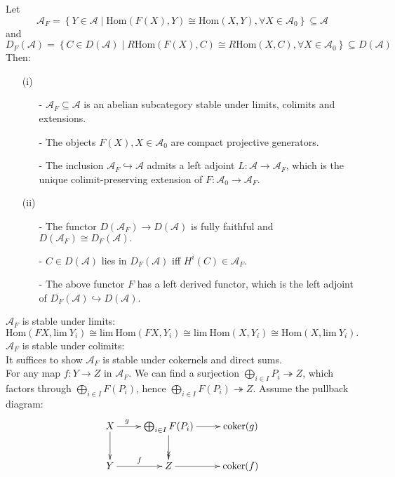 \documentclass[UTF8,12,a4paper]{ctexart}
\theoremstyle{definition}
\begin{document}
Let 
$$\mathcal{A}_F=\left\{Y\in\mathcal{A}\mid  
\text{Hom}(F(X),Y)\cong \text{Hom}(X,Y), \forall X\in\mathcal{A}_0
\right\}\subseteq \mathcal{A}$$
and 
$$
D_F(\mathcal{A})=\left\{C\in D(\mathcal{A})\mid  
R\text{Hom}(F(X),C)\cong R\text{Hom}(X,C), \forall X\in\mathcal{A}_0
\right\}\subseteq D(\mathcal{A})
$$
Then:
\begin{itemize}
\item [(i)]
	\begin{itemize}
		\item [-]	$\mathcal{A}_F \subseteq \mathcal{A}$ is an abelian subcategory stable under limits, colimits and extensions.
		\item [-]The objects $F(X), X\in \mathcal{A}_0$ are compact projective generators.
		\item [-]	The inclusion $\mathcal{A}_F\hookrightarrow \mathcal{A}$ admits a left adjoint $L:\mathcal{A}\rightarrow \mathcal{A}_F$, which is the unique colimit-preserving extension of $F:\mathcal{A}_0\rightarrow\mathcal{A}_F.$
	\end{itemize}
\item [(ii)] 
	\begin{itemize}
		\item [-]	The functor $D(\mathcal{A}_F)\rightarrow D(\mathcal{A})$ is fully faithful and $D(\mathcal{A}_F)\cong D_F(\mathcal{A}).$
		\item [-]$C\in D(\mathcal{A})$ lies in $D_F(\mathcal{A})$ iff $H^i(C)\in \mathcal{A}_F.$
		\item [-]	The above functor $F$ has a left derived functor, which is the left adjoint of $D_F(\mathcal{A})\hookrightarrow D(\mathcal{A}).$
	\end{itemize}
\end{itemize}
\pf 
$\mathcal{A}_F$ is stable under limits: \\
$
\text{Hom}(FX,\text{lim}\ Y_i)\cong \text{lim}\ \text{Hom}(FX, Y_i)\cong \text{lim}\ \text{Hom}(X, Y_i)\cong \text{Hom}(X,\text{lim}\ Y_i).
$\\
$\mathcal{A}_F$ is stable under colimits: \\
It suffices to show $\mathcal{A}_F$ is stable under cokernels and direct sums.\\
For any map $f: Y\rightarrow Z$ in $\mathcal{A}_F$. We can find a surjection $\bigoplus_{i\in I} P_i\twoheadrightarrow Z$, which factors through $\bigoplus_{i\in I} F(P_i)$, hence $\bigoplus_{i\in I} F(P_i)\twoheadrightarrow Z$. Assume the pullback diagram:
\begin{equation*}
\xymatrix
{
X\ar[r]^(.29)g\ar[d] &\bigoplus_{i\in I} F(P_i)\ar@{->>}[d]\ar[r]&\text{coker}(g)\\
Y\ar[r]^f& Z\ar[r]&\text{coker}(f)	
} 
\end{equation*}
\end{document}
